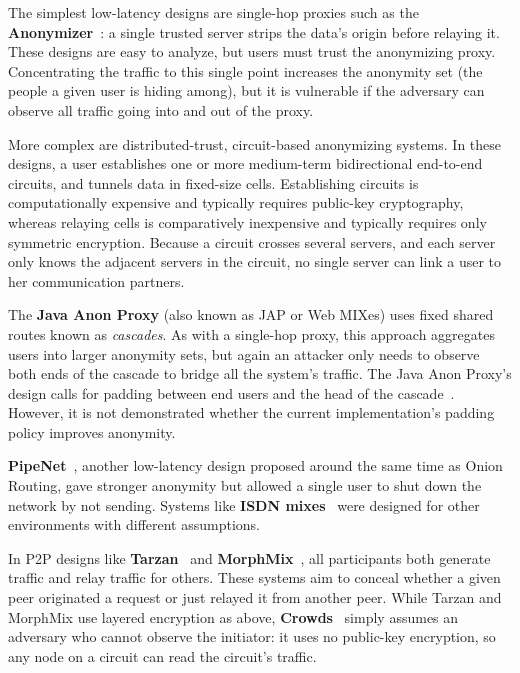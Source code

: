 \documentclass[times,10pt,twocolumn]{article}
\begin{document}
The simplest low-latency designs are single-hop proxies such as the
{\bf Anonymizer}~\cite{anonymizer}: a single trusted server strips the
data's origin before relaying it.  These designs are easy to
analyze, but users must trust the anonymizing proxy.
Concentrating the traffic to this single point increases the anonymity set
(the people a given user is hiding among), but it is vulnerable if the
adversary can observe all traffic going into and out of the proxy.

More complex are distributed-trust, circuit-based anonymizing systems.
In these designs, a user establishes one or more medium-term bidirectional
end-to-end circuits, and tunnels data in fixed-size cells.
Establishing circuits is computationally expensive and typically
requires public-key
cryptography, whereas relaying cells is comparatively inexpensive and
typically requires only symmetric encryption.
Because a circuit crosses several servers, and each server only knows
the adjacent servers in the circuit, no single server can link a
user to her communication partners.

The {\bf Java Anon Proxy} (also known as JAP or Web MIXes) uses fixed shared
routes known as \emph{cascades}.  As with a single-hop proxy, this
approach aggregates users into larger anonymity sets, but again an
attacker only needs to observe both ends of the cascade to bridge all
the system's traffic.  The Java Anon Proxy's design
calls for padding between end users and the head of the
cascade~\cite{web-mix}. However, it is not demonstrated whether the current
implementation's padding policy improves anonymity.

{\bf PipeNet}~\cite{back01, pipenet}, another low-latency design proposed
around the same time as Onion Routing, gave
stronger anonymity but allowed a single user to shut
down the network by not sending. Systems like {\bf ISDN
mixes}~\cite{isdn-mixes} were designed for other environments with
different assumptions.

In P2P designs like {\bf Tarzan}~\cite{tarzan:ccs02} and
{\bf MorphMix}~\cite{morphmix:fc04}, all participants both generate
traffic and relay traffic for others. These systems aim to conceal
whether a given peer originated a request
or just relayed it from another peer. While Tarzan and MorphMix use
layered encryption as above, {\bf Crowds}~\cite{crowds-tissec} simply assumes
an adversary who cannot observe the initiator: it uses no public-key
encryption, so any node on a circuit can read the circuit's traffic.
\end{document}
